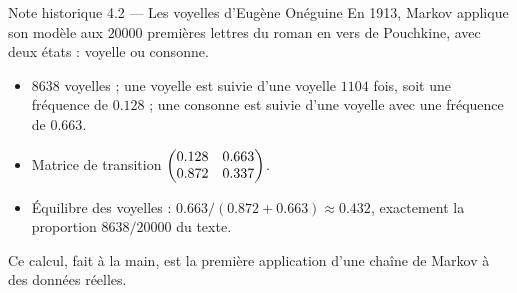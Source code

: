 \begin{frame}{Note historique 4.2 --- Les voyelles d'Eugène Onéguine}
  \small En 1913, Markov applique son modèle aux $\num{20000}$ premières
  lettres du roman en vers de Pouchkine, avec deux états : voyelle ou
  consonne.
  \begin{itemize}
    \item $\num{8638}$ voyelles ; une voyelle est suivie d'une voyelle
      $\num{1104}$ fois, soit une fréquence de $\num{0.128}$ ; une
      consonne est suivie d'une voyelle avec une fréquence de
      $\num{0.663}$.
    \item Matrice de transition
      $\begin{pmatrix}\num{0.128} & \num{0.663}\\ \num{0.872} & \num{0.337}\end{pmatrix}$.
    \item Équilibre des voyelles :
      $\num{0.663}/(\num{0.872}+\num{0.663})\approx\num{0.432}$,
      exactement la proportion $\num{8638}/\num{20000}$ du texte.
  \end{itemize}
  \vspace{4pt}
  Ce calcul, fait à la main, est la première application d'une chaîne de
  Markov à des données réelles.
\end{frame}
